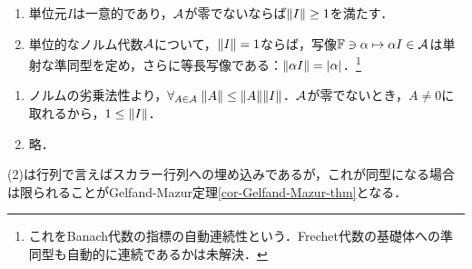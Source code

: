 \documentclass[uplatex,dvipdfmx]{jsreport}
\begin{document}
\begin{lemma}[単位元の性質について]\mbox{}
    \begin{enumerate}
        \item 単位元$I$は一意的であり，$\mathcal{A}$が零でないならば$\|I\|\ge 1$を満たす．
        \item 単位的なノルム代数$\mathcal{A}$について，$\|I\|=1$ならば，写像$\mathbb{F}\ni\alpha\mapsto\alpha I\in\mathcal{A}$は単射な準同型を定め，さらに等長写像である：$\|\alpha I\|=\lvert\alpha\rvert$．\footnote{これをBanach代数の指標の自動連続性という．Frechet代数の基礎体への準同型も自動的に連続であるかは未解決．}
    \end{enumerate}
\end{lemma}
\begin{Proof}\mbox{}
    \begin{enumerate}
        \item ノルムの劣乗法性より，$\forall_{A\in\mathcal{A}}\;\|A\|\le\|A\|\|I\|$．$\mathcal{A}$が零でないとき，$A\ne 0$に取れるから，$1\le\|I\|$．
        \item 略．
    \end{enumerate}
\end{Proof}
\begin{remarks}
    (2)は行列で言えばスカラー行列への埋め込みであるが，これが同型になる場合は限られることがGelfand-Mazur定理\ref{cor-Gelfand-Mazur-thm}となる．
\end{remarks}
\end{document}
